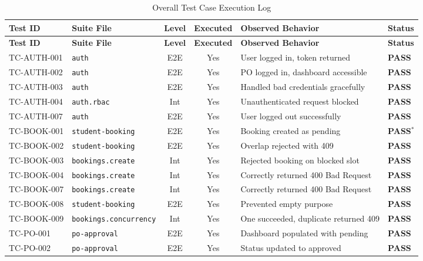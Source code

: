 \documentclass[11pt,a4paper]{article}
\begin{document}
\begin{center}
\begin{longtable}{@{}lp{3.6cm}ccp{4.5cm}p{2cm}@{}}
\caption{Overall Test Case Execution Log} \label{tab:exec_log} \\
\toprule
\textbf{Test ID} & \textbf{Suite File} & \textbf{Level} & \textbf{Executed} & \textbf{Observed Behavior} & \textbf{Status} \\ \midrule
\endfirsthead
\toprule
\textbf{Test ID} & \textbf{Suite File} & \textbf{Level} & \textbf{Executed} & \textbf{Observed Behavior} & \textbf{Status} \\ \midrule
\endhead
\bottomrule
\endfoot
\bottomrule
\endlastfoot

TC-AUTH-001 & \texttt{auth} & E2E & Yes & User logged in, token returned & \textbf{PASS} \\
TC-AUTH-002 & \texttt{auth} & E2E & Yes & PO logged in, dashboard accessible & \textbf{PASS} \\
TC-AUTH-003 & \texttt{auth} & E2E & Yes & Handled bad credentials gracefully & \textbf{PASS} \\
TC-AUTH-004 & \texttt{auth.rbac} & Int & Yes & Unauthenticated request blocked & \textbf{PASS} \\
TC-AUTH-007 & \texttt{auth} & E2E & Yes & User logged out successfully & \textbf{PASS} \\ \midrule
TC-BOOK-001 & \texttt{student-booking} & E2E & Yes & Booking created as pending & \textbf{PASS}$^{*}$ \\
TC-BOOK-002 & \texttt{student-booking} & E2E & Yes & Overlap rejected with 409 & \textbf{PASS} \\
TC-BOOK-003 & \texttt{bookings.create} & Int & Yes & Rejected booking on blocked slot & \textbf{PASS} \\
TC-BOOK-004 & \texttt{bookings.create} & Int & Yes & Correctly returned 400 Bad Request & \textbf{PASS} \\
TC-BOOK-007 & \texttt{bookings.create} & Int & Yes & Correctly returned 400 Bad Request & \textbf{PASS} \\
TC-BOOK-008 & \texttt{student-booking} & E2E & Yes & Prevented empty purpose & \textbf{PASS} \\
TC-BOOK-009 & \texttt{bookings.concurrency} & Int & Yes & One succeeded, duplicate returned 409 & \textbf{PASS} \\ \midrule
TC-PO-001 & \texttt{po-approval} & E2E & Yes & Dashboard populated with pending & \textbf{PASS} \\
TC-PO-002 & \texttt{po-approval} & E2E & Yes & Status updated to approved & \textbf{PASS} \\

\end{longtable}
\end{center}
\end{document}
